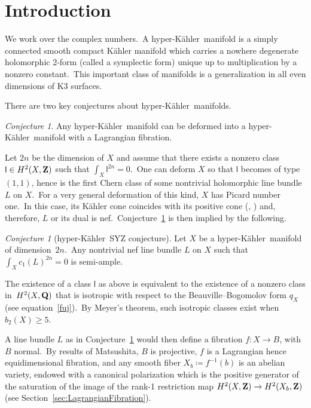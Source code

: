 \documentclass[12pt]{amsart}
\def\Z{{\bf Z}}
\def\Q{{\bf Q}}
\def\hk{hyper-K\"ahler}
\theoremstyle{remark}
\newtheorem{conj}[lemm]{Conjecture}
\def\lll{\ensuremath{\mathsf l}}
\begin{document}
\maketitle

\tableofcontents
\setcounter{tocdepth}{1}


\section{Introduction}\label{sec:intro}

We work over the complex numbers.\
A \hk\ manifold is a simply connected smooth compact K\"ahler manifold which carries a nowhere degenerate holomorphic 2-form (called a symplectic form) unique up to multiplication by a nonzero  constant.\
This important class of manifolds is a generalization in all even dimensions of K3 surfaces.

There are two key conjectures about \hk\ manifolds.

\begin{conj}\label{conj:defoSYZ}
Any \hk\ manifold can be deformed into a \hk\ manifold with a Lagrangian fibration.
\end{conj}

Let $2n$ be the dimension of $X$ and assume that there exists a nonzero class $\lll\in H^2(X,\Z)$ such that $\int_X\lll^{2n}=0$.\
One can deform $X$ so that $\lll$ becomes of type~$(1,1)$, hence is the first Chern class of some nontrivial holomorphic line bundle $L$ on $X$.\
For a very general deformation of this kind, $X$ has Picard number one.\
In this case, its K\"ahler cone coincides with its positive cone (\cite{HuyHK}, \cite[Proposition 3.2]{huyKahler}) and, therefore, $L$ or its dual is nef.\
Conjecture~\ref{conj:defoSYZ} is then implied by the following.

\begin{conj}[\hk\ SYZ conjecture]\label{conj:SYZ}
Let $X$ be a \hk\ manifold of dimension~$2n$.\
Any nontrivial nef line bundle $L$ on $X$ such that $\int_X c_1(L)^{2n}=0$ is semi-ample.
\end{conj}

The existence of a class $\lll$ as above is equivalent to the existence of a nonzero class in~$H^2(X,\Q)$ that is isotropic with respect to the Beauville--Bogomolov form $q_X$ (see equation~\eqref{fuj}).\
By Meyer's theorem, such isotropic classes exist when \mbox{$b_2(X)\geq 5$.}\

A line bundle $L$ as in Conjecture~\ref{conj:SYZ} would then define a fibration $f\colon X\to B$, with~$B$ normal.\
By results of Matsushita, $B$ is projective, $f$ is a Lagrangian hence equidimensional fibration, and any smooth fiber $X_b\coloneqq f^{-1}(b)$ is an abelian variety, endowed  with a canonical polarization which is the positive generator of the saturation of the image of the rank-1 restriction map $H^2(X,\Z)\to H^2(X_b,\Z)$ (see Section~\ref{sec:LagrangianFibration}).\ 
\end{document}
